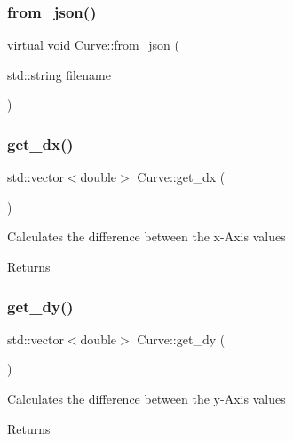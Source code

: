 \subsubsection{\texorpdfstring{from\+\_\+json()}{from\_json()}}
{\footnotesize\ttfamily virtual void Curve\+::from\+\_\+json (\begin{DoxyParamCaption}\item[{std\+::string}]{filename }\end{DoxyParamCaption})\hspace{0.3cm}{\ttfamily [virtual]}}

\mbox{\label{class_curve_a1e74c35667105b4ce24c913b4963000a}} 
\subsubsection{\texorpdfstring{get\+\_\+dx()}{get\_dx()}}
{\footnotesize\ttfamily std\+::vector$<$double$>$ Curve\+::get\+\_\+dx (\begin{DoxyParamCaption}{ }\end{DoxyParamCaption})}

Calculates the difference between the x-\/\+Axis values \begin{DoxyReturn}{Returns}

\end{DoxyReturn}
\mbox{\label{class_curve_aaa80e048e9d96c5c82a7e83d05269140}} 
\subsubsection{\texorpdfstring{get\+\_\+dy()}{get\_dy()}}
{\footnotesize\ttfamily std\+::vector$<$double$>$ Curve\+::get\+\_\+dy (\begin{DoxyParamCaption}{ }\end{DoxyParamCaption})}

Calculates the difference between the y-\/\+Axis values \begin{DoxyReturn}{Returns}

\end{DoxyReturn}
\mbox{\label{class_curve_aa4c5bd9700d1db6073179b2d1b61775b}} 
